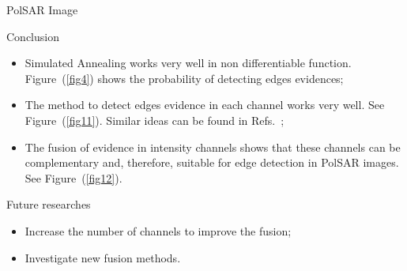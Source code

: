 \documentclass[10pt]{beamer}
\begin{document}
\begin{frame}[fragile]{PolSAR Image}
\begin{alertblock}{Conclusion}
\begin{itemize}
	\item Simulated Annealing works very well in non differentiable function. Figure~(\ref{fig4}) shows the probability of detecting edges evidences;
	\item The method to detect edges evidence in each channel works very well. See Figure~(\ref{fig11}). Similar ideas can be found in  Refs.~\cite{fbgm,nhfc};
	\item The fusion of evidence in intensity channels shows that these channels can be complementary and, therefore, suitable for edge detection in PolSAR images. See Figure~(\ref{fig12}).
\end{itemize}
\end{alertblock}
\begin{alertblock}{Future researches}	
\begin{itemize}
	\item Increase the number of channels to improve the fusion;
	\item Investigate new fusion methods.
\end{itemize}
\end{alertblock}
\end{frame}

\begin{frame}[allowframebreaks]


\end{frame}
\end{document}
